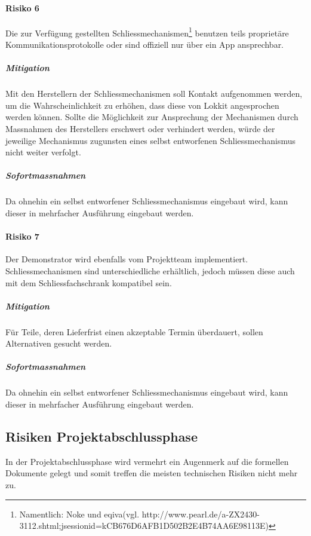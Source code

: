 \paragraph{Risiko 6}
Die zur Verfügung gestellten Schliessmechanismen\footnote{Namentlich: Noke und eqiva(vgl. http://www.pearl.de/a-ZX2430-3112.shtml;jsessionid=kCB676D6AFB1D502B2E4B74AA6E98113E)} benutzen teils proprietäre Kommunikationsprotokolle oder sind offiziell nur über ein App ansprechbar.
\subparagraph{Mitigation}
Mit den Herstellern der Schliessmechanismen soll Kontakt aufgenommen werden, um die Wahrscheinlichkeit zu erhöhen, dass diese von Lokkit angesprochen werden können. Sollte die Möglichkeit zur Ansprechung der Mechanismen durch Massnahmen des Herstellers erschwert oder verhindert werden, würde der jeweilige Mechanismus zugunsten eines selbst entworfenen Schliessmechanismus nicht weiter verfolgt.
\subparagraph{Sofortmassnahmen}
Da ohnehin ein selbst entworfener Schliessmechanismus eingebaut wird, kann dieser in mehrfacher Ausführung eingebaut werden.

\paragraph{Risiko 7}
Der Demonstrator wird ebenfalls vom Projektteam implementiert. Schliessmechanismen sind unterschiedliche erhältlich, jedoch müssen diese auch mit dem Schliessfachschrank kompatibel sein.
\subparagraph{Mitigation}
Für Teile, deren Lieferfrist einen akzeptable Termin überdauert, sollen Alternativen gesucht werden.
\subparagraph{Sofortmassnahmen}
Da ohnehin ein selbst entworfener Schliessmechanismus eingebaut wird, kann dieser in mehrfacher Ausführung eingebaut werden.


\subsection{Risiken Projektabschlussphase}
In der Projektabschlussphase wird vermehrt ein Augenmerk auf die formellen Dokumente gelegt und somit treffen die meisten technischen Risiken nicht mehr zu.

